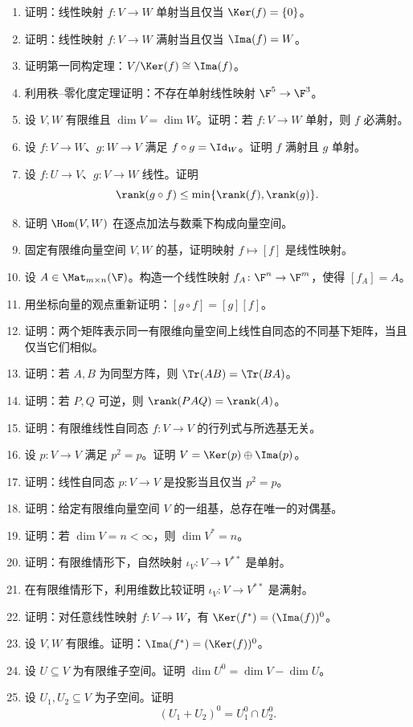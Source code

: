 \begin{enumerate}[label=\textbf{\arabic*.}, leftmargin=3.5em, start=31]
  \item {\medium} 证明：线性映射 $f\colon V\to W$ 单射当且仅当 $\Ker(f)=\{0\}$。
  \item {\medium} 证明：线性映射 $f\colon V\to W$ 满射当且仅当 $\Ima(f)=W$。
  \item {\medium} 证明第一同构定理：$V/\Ker(f)\cong \Ima(f)$。
  \item {\medium} 利用秩--零化度定理证明：不存在单射线性映射 $\F^5\to\F^3$。
  \item {\medium} 设 $V,W$ 有限维且 $\dim V=\dim W$。证明：若 $f\colon V\to W$ 单射，则 $f$ 必满射。
  \item {\medium} 设 $f\colon V\to W$、$g\colon W\to V$ 满足 $f\circ g=\Id_W$。证明 $f$ 满射且 $g$ 单射。
  \item {\medium} 设 $f\colon U\to V$、$g\colon V\to W$ 线性。证明
  \[
    \rank(g\circ f)\le \min\{\rank(f),\rank(g)\}.
  \]
  \item {\medium} 证明 $\Hom(V,W)$ 在逐点加法与数乘下构成向量空间。
  \item {\medium} 固定有限维向量空间 $V,W$ 的基，证明映射 $f\mapsto [f]$ 是线性映射。
  \item {\medium} 设 $A\in\Mat_{m\times n}(\F)$。构造一个线性映射 $f_A\colon \F^n\to\F^m$，使得 $[f_A]=A$。
  \item {\medium} 用坐标向量的观点重新证明：$[g\circ f]=[g][f]$。
  \item {\medium} 证明：两个矩阵表示同一有限维向量空间上线性自同态的不同基下矩阵，当且仅当它们相似。
  \item {\medium} 证明：若 $A,B$ 为同型方阵，则 $\Tr(AB)=\Tr(BA)$。
  \item {\medium} 证明：若 $P,Q$ 可逆，则 $\rank(PAQ)=\rank(A)$。
  \item {\medium} 证明：有限维线性自同态 $f\colon V\to V$ 的行列式与所选基无关。
  \item {\medium} 设 $p\colon V\to V$ 满足 $p^2=p$。证明 $V=\Ker(p)\oplus\Ima(p)$。
  \item {\medium} 证明：线性自同态 $p\colon V\to V$ 是投影当且仅当 $p^2=p$。
  \item {\medium} 证明：给定有限维向量空间 $V$ 的一组基，总存在唯一的对偶基。
  \item {\medium} 证明：若 $\dim V=n<\infty$，则 $\dim V^*=n$。
  \item {\medium} 证明：有限维情形下，自然映射 $\iota_V\colon V\to V^{**}$ 是单射。
  \item {\medium} 在有限维情形下，利用维数比较证明 $\iota_V\colon V\to V^{**}$ 是满射。
  \item {\medium} 证明：对任意线性映射 $f\colon V\to W$，有 $\Ker(f^*)=(\Ima(f))^0$。
  \item {\medium} 设 $V,W$ 有限维。证明：$\Ima(f^*)=(\Ker(f))^0$。
  \item {\medium} 设 $U\subseteq V$ 为有限维子空间。证明 $\dim U^0=\dim V-\dim U$。
  \item {\medium} 设 $U_1,U_2\subseteq V$ 为子空间。证明
  \[
    (U_1+U_2)^0=U_1^0\cap U_2^0.
  \]
\end{enumerate}

